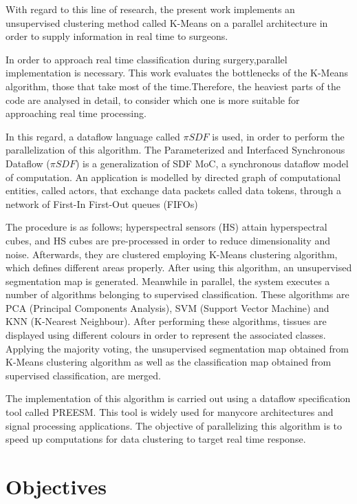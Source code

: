 With regard to this line of research, the present work implements an unsupervised clustering method called K-Means on a parallel architecture in order to supply information in real time to surgeons. 


In order to approach real time classification during surgery,parallel implementation is necessary. This work evaluates the bottlenecks of the K-Means algorithm, those that take most of the time.Therefore, the heaviest parts of the code are analysed in detail, to consider which one is more suitable for approaching real time processing. 


In this regard, a dataflow language called $\pi SDF$ is used, in order to perform the parallelization of this algorithm. The Parameterized and Interfaced Synchronous Dataflow ($\pi SDF$) is a generalization of SDF MoC, a synchronous dataflow model of computation. An application is modelled by directed graph of computational entities, called actors, that exchange data packets called data tokens, through a
network of First-In First-Out queues (FIFOs)\cite{lee1987synchronous}

The procedure is as follows; hyperspectral sensors  (HS)  attain hyperspectral cubes, and HS cubes are pre-processed in order to reduce dimensionality and noise. Afterwards, they are clustered employing K-Means clustering algorithm, which defines different areas properly. After using this algorithm, an unsupervised segmentation map is generated. 
Meanwhile in parallel, the system executes a number of algorithms belonging to supervised classification. These algorithms are PCA (Principal Components Analysis), SVM (Support Vector Machine) and KNN (K-Nearest Neighbour). After performing these algorithms, tissues are displayed using different colours in order to represent the associated classes. 
Applying the majority voting, the unsupervised segmentation map obtained from K-Means clustering algorithm as well as the classification map obtained from supervised classification, are merged. 

The implementation of this algorithm is carried out using a dataflow specification tool called PREESM. This tool is widely used for manycore architectures and signal processing applications. The objective of parallelizing this algorithm is to speed up computations for data clustering to target real time response.

    \section{Objectives}
    
